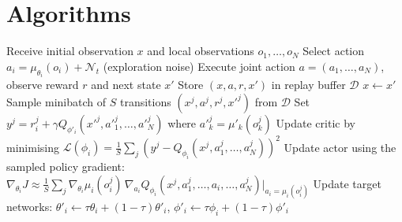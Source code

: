 \documentclass[12pt]{article}
\begin{document}
\appendix

\section{Algorithms}

\begin{algorithm}[H]
\caption{Multi-Agent Deep Deterministic Policy Gradient (MADDPG) for $N$ agents}
\label{alg:maddpg}
\begin{algorithmic}[1]
  \State Receive initial observation $x$ and local observations $o_1, \ldots, o_N$
      \State Select action $a_i = \mu_{\theta_i}(o_i) + \mathcal{N}_t$ (exploration noise)
    \EndFor
    \State Execute joint action $a = (a_1, \ldots, a_N)$, observe reward $r$ and next state $x'$
    \State Store $(x, a, r, x')$ in replay buffer $\mathcal{D}$
    \State $x \leftarrow x'$
      \State Sample minibatch of $S$ transitions $(x^j, a^j, r^j, x'^j)$ from $\mathcal{D}$
      \State Set $y^j = r^j_i + \gamma Q_{\phi'_i}(x'^j, a'^j_1, \ldots, a'^j_N)$
             where $a'^j_k = \mu'_k(o^j_k)$
      \State Update critic by minimising
             $\mathcal{L}(\phi_i) = \frac{1}{S}\sum_j (y^j - Q_{\phi_i}(x^j, a^j_1, \ldots, a^j_N))^2$
      \State Update actor using the sampled policy gradient:
             $\nabla_{\theta_i} J \approx \frac{1}{S}\sum_j
             \nabla_{\theta_i}\mu_i(o^j_i)\,\nabla_{a_i}Q_{\phi_i}(x^j, a^j_1, \ldots, a_i, \ldots, a^j_N)
             \big|_{a_i = \mu_i(o^j_i)}$
    \EndFor
      \State Update target networks:
             $\theta'_i \leftarrow \tau\theta_i + (1-\tau)\theta'_i$,\;
             $\phi'_i \leftarrow \tau\phi_i + (1-\tau)\phi'_i$
    \EndFor
  \EndFor
\EndFor
\end{algorithmic}
\end{algorithm}
\end{document}
